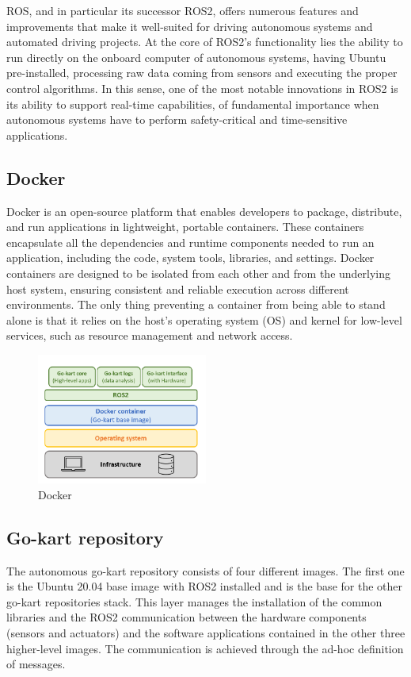 \documentclass[a4paper,12pt,oneside]{book}
\begin{document}
\bigskip
ROS, and in particular its successor ROS2, offers numerous features and improvements that make it well-suited for driving autonomous systems and automated driving projects.
At the core of ROS2's functionality lies the ability to run directly on the onboard computer of autonomous systems, having Ubuntu pre-installed, processing raw data coming from sensors and executing the proper control algorithms.
In this sense, one of the most notable innovations in ROS2 is its ability to support real-time capabilities, of fundamental importance when autonomous systems have to perform safety-critical and time-sensitive applications.


\subsection*{Docker}
Docker is an open-source platform that enables developers to package, distribute, and run applications in lightweight, portable containers. 
These containers encapsulate all the dependencies and runtime components needed to run an application, including the code, system tools, libraries, and settings.
Docker containers are designed to be isolated from each other and from the underlying host system, ensuring consistent and reliable execution across different environments.
The only thing preventing a container from being able to stand alone is that it relies on the host’s operating system (OS) and kernel for low-level services, such as resource management and network access.
\begin{figure}
	\centering
	\includegraphics[width=0.5\textwidth]{Docker.png}
	\caption{Docker}
	\label{image:Docker}
\end{figure}

\subsection*{Go-kart repository}
The autonomous go-kart repository consists of four different images. 
The first one is the Ubuntu 20.04 base image with ROS2 installed and is the base for the other go-kart repositories stack.
This layer manages the installation of the common libraries and the ROS2 communication between the hardware components (sensors and actuators) and the software applications contained in the other three higher-level images. 
The communication is achieved through the ad-hoc definition of messages.
\end{document}
